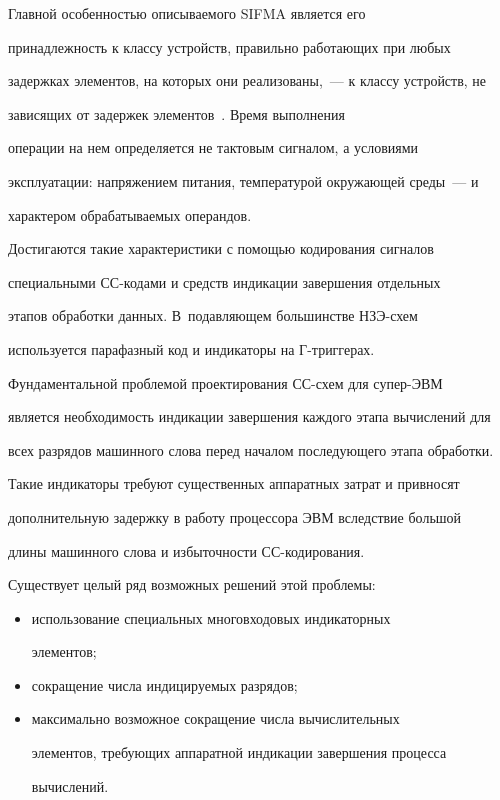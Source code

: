       Главной особенностью описываемого SIFMA является его

принадлежность к классу устройств, правильно работающих при любых

задержках элементов, на которых они реализованы,~--- к классу устройств, не

зависящих от задержек элементов~\cite{2-st1, 3-st1}. Время выполнения

операции на нем определяется не тактовым сигналом, а условиями

эксплуатации: напряжением питания, температурой окружающей среды~--- и

характером обрабатываемых операндов.



      Достигаются такие характеристики с помощью кодирования сигналов

специальными СС-ко\-да\-ми и средств индикации завершения отдельных

этапов обработки данных. В~подавляющем большинстве НЗЭ-схем

используется парафазный код и индикаторы на Г-триг\-герах.



      Фундаментальной проблемой проектирования СС-схем для су\-пер-ЭВМ

является необходимость индикации завершения каждого этапа вычислений для

всех разрядов машинного слова перед началом последующего этапа обработки.

Такие индикаторы требуют существенных аппаратных затрат и привносят

дополнительную задержку в работу процессора ЭВМ вследствие большой

длины машинного слова и избыточности СС-ко\-ди\-ро\-вания.



      Существует целый ряд возможных решений этой проблемы:

      \begin{itemize}

      \item использование специальных многовходовых индикаторных

элементов;

      \item сокращение числа индицируемых разрядов;

      \item максимально возможное сокращение числа вычислительных

элементов, требующих аппаратной индикации завершения процесса

вычислений.

      \end{itemize}



